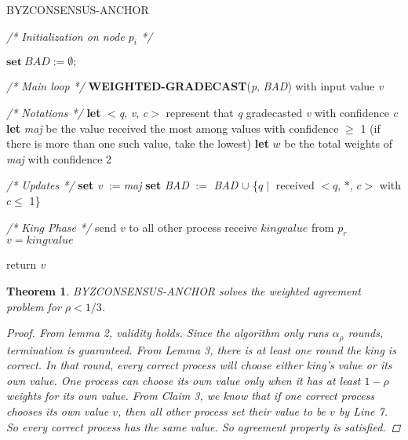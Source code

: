 \documentclass[conference]{IEEEtran}
\newtheorem{t1}{Theorem}
\begin{document}
\begin{algorithm}
\caption{BYZCONSENSUS-ANCHOR}\label{euclid}
\textit{/* Initialization on node $p_i$ */}
\begin{algorithmic}[1]
\STATE $\textbf{set} ~\textit{BAD} := \emptyset;$
\item[]
\item[]
\textit{/* Main loop */}
\STATE \textbf{WEIGHTED-GRADECAST}(\textit{p}, \textit{BAD}) with input value \textit{v}
\item[]
\item[]
\textit{/* Notations */}
\STATE \textbf{let} $<$\textit{q}, \textit{v}, \textit{c}$>$ represent that \textit{q} gradecasted \textit{v} with confidence \textit{c}
\STATE \textbf{let} \textit{maj} be the value received the most among values with confidence $\geq$ 1
(if there is more than one such value, take the lowest)
\STATE \textbf{let} $w$ be the total weights of \textit{maj} with confidence 2
\item[]
\item[]
\textit{/* Updates */}
\STATE \textbf{set} \textit{v} $:=$\textit{maj}
\STATE \textbf{set} \textit{BAD} $:=$ \textit{BAD} $\cup$ \{$q \mid$ received $<q$, $\ast$, $c>$ with $c \leq$ 1\}
\item[]
\item[]
\textit{/* King Phase */}
\STATE send $v$ to all other process
\ENDIF
\STATE receive $kingvalue$ from $p_r$
\STATE $v = kingvalue$ 
\ENDIF
\ENDFOR
\item[]
\STATE return \textit{v}

\end{algorithmic}
\end{algorithm}
\begin{t1}
BYZCONSENSUS-ANCHOR solves the weighted agreement problem for $\rho < 1/3$.
\begin{proof}
From lemma 2, validity holds. Since the algorithm only runs $\alpha_\rho$ rounds, termination is guaranteed. From Lemma 3, there is at least one round the king is correct. In that round, every correct process will choose either king's value or its own value. One process can choose its own value only when it has at least $1 - \rho$ weights for its own value. From Claim 3,  we know that if one correct process chooses its own value $v$,  then all other process set their value to be $v$ by Line 7. So every correct process has the same value. So agreement property is satisfied. 
\end{proof}
\end{t1}
\end{document}
